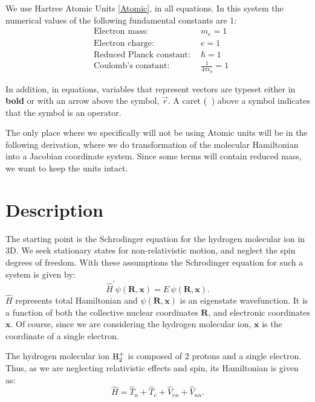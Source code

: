 We use Hartree Atomic Units \eqref{Atomic}, in all equations. In this system the numerical values of the following fundamental constants are 1:
\setlength{\mathindent}{0pt}
\begin{equation}\label{Atomic}
\begin{split}
    & \text{Electron mass:}\ &\ m_e = 1 \\ 
    & \text{Electron charge:}\ &\ e = 1 \\
    & \text{Reduced Planck constant:}\ &\ \hbar = 1 \\
    & \text{Coulomb's constant:}\ &\ \frac{1}{4\pi\epsilon_0} = 1
\end{split}
\end{equation}

In addition, in equations, variables that represent vectors are typeset either in \textbf{bold} or with an arrow above the symbol, $ \vec{r} $. A caret ($ \hat{}\ $ ) above a symbol indicates that the symbol is an operator.

The only place where we specifically will not be using Atomic units will be in the following derivation, where we do transformation of the molecular Hamiltonian into a Jacobian coordinate system. Since some terms will contain reduced mass, we want to keep the units intact.

\section{Description}
The starting point is the Schrodinger equation for the hydrogen molecular ion in 3D. We 
seek stationary states for non-relativistic motion, and neglect the spin degrees of freedom. With these assumptions the Schrodinger equation for such a system is given by:
\begin{equation}\label{sch1}
\hat{H}^{'}\psi\left(\mathbf{R},\mathbf{x}\right) = E\,\psi\left(\mathbf{R},\mathbf{x}\right).
\end{equation}
$ \hat{H} $ represents total Hamiltonian and $ \psi\left(\mathbf{R},\mathbf{x}\right) $ is an eigenstate wavefunction. It is a function of both the collective nuclear coordinates $ \mathbf{R} $,  and electronic coordinates $\mathbf{x} $. Of course, since we are considering the hydrogen molecular ion, $\mathbf{x} $ is the coordinate of a single electron.

The hydrogen molecular ion $ {\rm H}_2^{+} $ is composed of 2 protons and a single electron. Thus, as we are neglecting relativistic effects and spin, its Hamiltonian is given as:
\begin{equation}\label{hh}
\hat{H} = \hat{T}_n + \hat{T}_e + \hat{V}_{en} + \hat{V}_{nn}. 
\end{equation}

